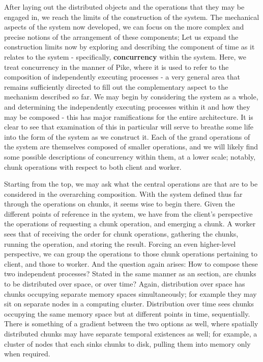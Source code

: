 After laying out the distributed objects and the operations that they
may be engaged in, we reach the limits of the construction of the
system. The mechanical aspects of the system now developed, we can focus
on the more complex and precise notions of the arrangement of these
components; Let us expand the construction limits now by exploring and
describing the component of time as it relates to the system -
specifically, \textbf{concurrency} within the system. Here, we treat
concurrency in the manner of Pike, where it is used to refer to the
composition of independently executing processes - a very general area
that remains sufficiently directed to fill out the complementary aspect
to the mechanism described so far. We may begin by considering the
system as a whole, and determining the independently executing processes
within it and how they may be composed - this has major ramifications
for the entire architecture. It is clear to see that examination of this
in particular will serve to breathe some life into the form of the
system as we construct it. Each of the grand operations of the system
are themselves composed of smaller operations, and we will likely find
some possible descriptions of concurrency within them, at a lower scale;
notably, chunk operations with respect to both client and worker.

Starting from the top, we may ask what the central operations are that
are to be considered in the overarching composition. With the system
defined thus far through the operations on chunks, it seems wise to
begin there. Given the different points of reference in the system, we
have from the client's perspective the operations of requesting a chunk
operation, and emerging a chunk. A worker sees that of receiving the
order for chunk operations, gathering the chunks, running the operation,
and storing the result. Forcing an even higher-level perspective, we can
group the operations to those chunk operations pertaining to client, and
those to worker. And the question again arises: How to compose these two
independent processes? Stated in the same manner as an section, are
chunks to be distributed over space, or over time? Again, distribution
over space has chunks occupying separate memory spaces simultaneously;
for example they may sit on separate nodes in a computing cluster.
Distribution over time sees chunks occupying the same memory space but
at different points in time, sequentially. There is something of a
gradient between the two options as well, where spatially distributed
chunks may have separate temporal existences as well; for example, a
cluster of nodes that each sinks chunks to disk, pulling them into
memory only when required.

